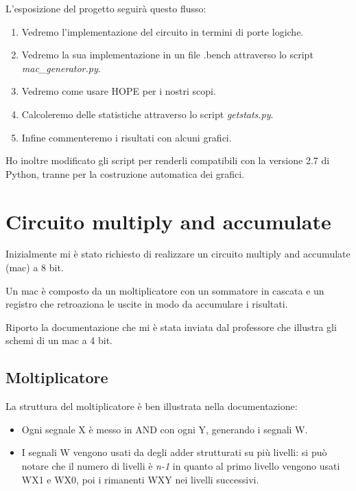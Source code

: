 \documentclass[12pt, letterpaper]{article}
\begin{document}
L'esposizione del progetto seguirà questo flusso: 
\begin{enumerate}
\item Vedremo l'implementazione del circuito in termini di porte logiche.
\item Vedremo la sua implementazione in un file .bench attraverso lo script \textit{mac\_generator.py}.
\item Vedremo come usare HOPE per i nostri scopi.
\item Calcoleremo delle statistiche attraverso lo script \textit{getstats.py}.
\item Infine commenteremo i risultati con alcuni grafici.
\end{enumerate}

Ho inoltre modificato gli script per renderli compatibili con la versione 2.7 di Python, tranne per la costruzione automatica dei grafici.

\section{Circuito multiply and accumulate}

Inizialmente mi è stato richiesto di realizzare un circuito multiply and accumulate (mac) a 8 bit.

Un mac è composto da un moltiplicatore con un sommatore in cascata e un registro che retroaziona le uscite in modo da accumulare i risultati.

Riporto la documentazione che mi è stata inviata dal professore che illustra gli schemi di un mac a 4 bit.



\subsection{Moltiplicatore}
La struttura del moltiplicatore è ben illustrata nella documentazione:

\begin{itemize}
  \item Ogni segnale X è messo in AND con ogni Y, generando i segnali W.
  \item I segnali W vengono usati da degli adder strutturati su più livelli: si può notare che il numero di livelli è \textit{n-1} in quanto al primo livello vengono usati WX1 e WX0, poi i rimanenti WXY nei livelli successivi.
\end{itemize}
\end{document}
